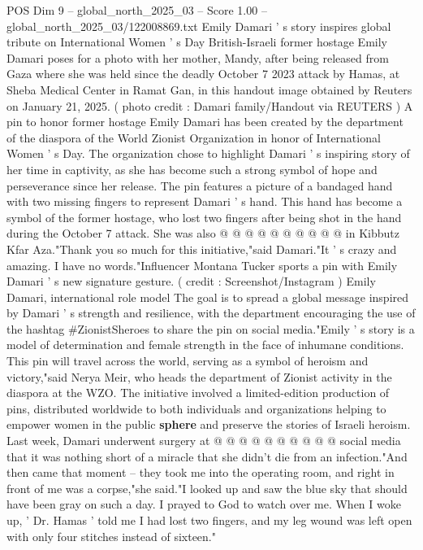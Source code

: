 \begin{textsample}{POS Dim 9 – global\_north\_2025\_03 – Score 1.00 – global\_north\_2025\_03/122008869.txt}  \label{ex:f9_pos_386}
Emily Damari ' s story inspires global tribute on International Women ' s Day British-Israeli former hostage Emily Damari poses for a photo with her mother, Mandy, after being released from Gaza where she was held since the deadly October 7 2023 attack by Hamas, at Sheba Medical Center in Ramat Gan, in this handout image obtained by Reuters on January 21, 2025. ( photo credit : Damari family/Handout via REUTERS ) A pin to honor former hostage Emily Damari has been created by the department of the diaspora of the World Zionist Organization in honor of International Women ' s Day.
The organization chose to highlight Damari ' s inspiring story of her time in captivity, as she has become such a strong symbol of hope and perseverance since her release.
The pin features a picture of a bandaged hand with two missing fingers to represent Damari ' s hand.
This hand has become a symbol of the former hostage, who lost two fingers after being shot in the hand during the October 7 attack.
She was also @ @ @ @ @ @ @ @ @ @ in Kibbutz Kfar Aza."Thank you so much for this initiative,"said Damari."It ' s crazy and amazing.
I have no words."Influencer Montana Tucker sports a pin with Emily Damari ' s new signature gesture. ( credit : Screenshot/Instagram ) Emily Damari, international role model The goal is to spread a global message inspired by Damari ' s strength and resilience, with the department encouraging the use of the hashtag \#ZionistSheroes to share the pin on social media."Emily ' s story is a model of determination and female strength in the face of inhumane conditions.
This pin will travel across the world, serving as a symbol of heroism and victory,"said Nerya Meir, who heads the department of Zionist activity in the diaspora at the WZO.
The initiative involved a limited-edition production of pins, distributed worldwide to both individuals and organizations helping to empower women in the public \textbf{sphere} and preserve the stories of Israeli heroism.
Last week, Damari underwent surgery at @ @ @ @ @ @ @ @ @ @ social media that it was nothing short of a miracle that she didn't die from an infection."And then came that moment -- they took me into the operating room, and right in front of me was a corpse,"she said."I looked up and saw the blue sky that should have been gray on such a day.
I prayed to God to watch over me.
When I woke up, ' Dr.
Hamas ' told me I had lost two fingers, and my leg wound was left open with only four stitches instead of sixteen."

\end{textsample}
